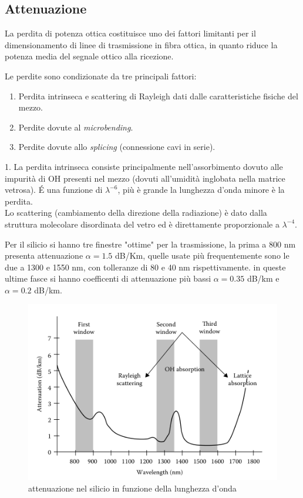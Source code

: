 \documentclass[12pt, a4paper]{article}
\begin{document}
\subsection{Attenuazione}
\label{sub:attenuazione}

La perdita di potenza ottica costituisce uno dei fattori limitanti per il dimensionamento di linee di trasmissione in fibra ottica, in quanto riduce la potenza media del segnale ottico alla ricezione.

Le perdite sono condizionate da tre principali fattori:
\begin{enumerate}
	\item Perdita intrinseca e scattering di Rayleigh dati dalle caratteristiche fisiche del mezzo.
	\item Perdite dovute al \textit{microbending}.
	\item Perdite dovute allo \textit{splicing} (connessione cavi in serie).
\end{enumerate}

1. La perdita intrinseca consiste principalmente nell'assorbimento dovuto alle impurità di OH presenti nel mezzo (dovuti all'umidità inglobata nella matrice vetrosa). É una funzione di $\lambda^{-6}$, più è grande la lunghezza d'onda minore è la perdita.\\
Lo scattering  (cambiamento della direzione della radiazione) è dato dalla struttura molecolare disordinata del vetro ed è direttamente proporzionale a $\lambda^{-4}$.

Per il silicio si hanno tre finestre "ottime" per la trasmissione, la prima a 800 nm presenta attenuazione $\alpha = 1.5$ dB/Km, quelle usate più frequentemente sono le due a 1300 e 1550 nm, con tolleranze di 80 e 40 nm rispettivamente.
in queste ultime fasce si hanno coefficenti di attenuazione più bassi $\alpha = 0.35$ dB/km e $\alpha = 0.2 $ dB/km.


\begin{figure}[h!]
\centering
\includegraphics[scale=0.7]{attenuazione.png}
\caption{attenuazione nel silicio in funzione della lunghezza d'onda}
\end{figure}
\end{document}
